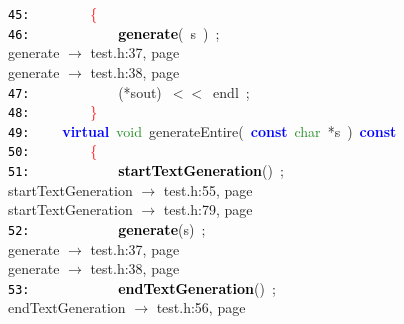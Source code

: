 \documentclass{article}
\begin{document}
\mbox{}\texttt{\textcolor{Black}{45:}} \ \ \ \ \ \ \ \ \textcolor{Red}{\{}\  \\
\mbox{}\texttt{\textcolor{Black}{46:}} \ \ \ \ \ \ \ \ \ \ \ \ \textbf{\textcolor{Black}{generate}}\textcolor{BrickRed}{(}\ s\ \textcolor{BrickRed}{)}\ \textcolor{BrickRed}{;} \\
\mbox{}{\hfill generate $\rightarrow$ test.h:37, page~\pageref{test.h:37}} \\
\mbox{}{\hfill generate $\rightarrow$ test.h:38, page~\pageref{test.h:38}} \\
\mbox{}\texttt{\textcolor{Black}{47:}} \ \ \ \ \ \ \ \ \ \ \ \ \textcolor{BrickRed}{(*}sout\textcolor{BrickRed}{)}\ \textcolor{BrickRed}{$<$$<$}\ endl\ \textcolor{BrickRed}{;}\  \\
\mbox{}\texttt{\textcolor{Black}{48:}} \ \ \ \ \ \ \ \ \textcolor{Red}{\}} \\
\mbox{}\texttt{\textcolor{Black}{49:}} \ \ \ \ \textbf{\textcolor{Blue}{virtual}}\ \textcolor{ForestGreen}{void}\ \label{test.h:49}generateEntire\textcolor{BrickRed}{(}\ \textbf{\textcolor{Blue}{const}}\ \textcolor{ForestGreen}{char}\ \textcolor{BrickRed}{*}s\ \textcolor{BrickRed}{)}\ \textbf{\textcolor{Blue}{const}} \\
\mbox{}\texttt{\textcolor{Black}{50:}} \ \ \ \ \ \ \ \ \textcolor{Red}{\{} \\
\mbox{}\texttt{\textcolor{Black}{51:}} \ \ \ \ \ \ \ \ \ \ \ \ \textbf{\textcolor{Black}{startTextGeneration}}\textcolor{BrickRed}{()}\ \textcolor{BrickRed}{;} \\
\mbox{}{\hfill startTextGeneration $\rightarrow$ test.h:55, page~\pageref{test.h:55}} \\
\mbox{}{\hfill startTextGeneration $\rightarrow$ test.h:79, page~\pageref{test.h:79}} \\
\mbox{}\texttt{\textcolor{Black}{52:}} \ \ \ \ \ \ \ \ \ \ \ \ \textbf{\textcolor{Black}{generate}}\textcolor{BrickRed}{(}s\textcolor{BrickRed}{)}\ \textcolor{BrickRed}{;} \\
\mbox{}{\hfill generate $\rightarrow$ test.h:37, page~\pageref{test.h:37}} \\
\mbox{}{\hfill generate $\rightarrow$ test.h:38, page~\pageref{test.h:38}} \\
\mbox{}\texttt{\textcolor{Black}{53:}} \ \ \ \ \ \ \ \ \ \ \ \ \textbf{\textcolor{Black}{endTextGeneration}}\textcolor{BrickRed}{()}\ \textcolor{BrickRed}{;} \\
\mbox{}{\hfill endTextGeneration $\rightarrow$ test.h:56, page~\pageref{test.h:56}} \\
\end{document}
